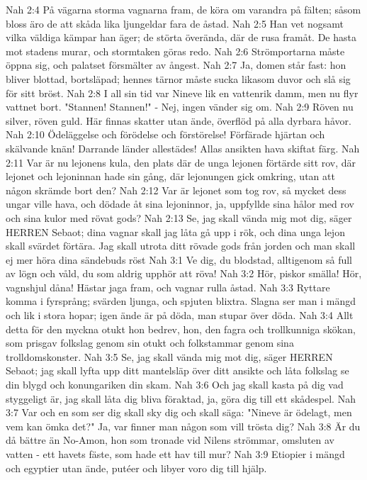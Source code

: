 Nah 2:4  På vägarna storma vagnarna fram, de köra om varandra på fälten; såsom bloss äro de att skåda lika ljungeldar fara de åstad.
Nah 2:5  Han vet nogsamt vilka väldiga kämpar han äger; de störta överända, där de rusa framåt. De hasta mot stadens murar, och stormtaken göras redo.
Nah 2:6  Strömportarna måste öppna sig, och palatset försmälter av ångest.
Nah 2:7  Ja, domen står fast: hon bliver blottad, bortsläpad; hennes tärnor måste sucka likasom duvor och slå sig för sitt bröst.
Nah 2:8  I all sin tid var Nineve lik en vattenrik damm, men nu flyr vattnet bort. "Stannen! Stannen!" - Nej, ingen vänder sig om.
Nah 2:9  Röven nu silver, röven guld. Här finnas skatter utan ände, överflöd på alla dyrbara håvor.
Nah 2:10  Ödeläggelse och förödelse och förstörelse! Förfärade hjärtan och skälvande knän! Darrande länder allestädes! Allas ansikten hava skiftat färg.
Nah 2:11  Var är nu lejonens kula, den plats där de unga lejonen förtärde sitt rov, där lejonet och lejoninnan hade sin gång, där lejonungen gick omkring, utan att någon skrämde bort den?
Nah 2:12  Var är lejonet som tog rov, så mycket dess ungar ville hava, och dödade åt sina lejoninnor, ja, uppfyllde sina hålor med rov och sina kulor med rövat gods?
Nah 2:13  Se, jag skall vända mig mot dig, säger HERREN Sebaot; dina vagnar skall jag låta gå upp i rök, och dina unga lejon skall svärdet förtära. Jag skall utrota ditt rövade gods från jorden och man skall ej mer höra dina sändebuds röst
Nah 3:1  Ve dig, du blodstad, alltigenom så full av lögn och våld, du som aldrig upphör att röva!
Nah 3:2  Hör, piskor smälla! Hör, vagnshjul dåna! Hästar jaga fram, och vagnar rulla åstad.
Nah 3:3  Ryttare komma i fyrsprång; svärden ljunga, och spjuten blixtra. Slagna ser man i mängd och lik i stora hopar; igen ände är på döda, man stupar över döda.
Nah 3:4  Allt detta för den myckna otukt hon bedrev, hon, den fagra och trollkunniga skökan, som prisgav folkslag genom sin otukt och folkstammar genom sina trolldomskonster.
Nah 3:5  Se, jag skall vända mig mot dig, säger HERREN Sebaot; jag skall lyfta upp ditt mantelsläp över ditt ansikte och låta folkslag se din blygd och konungariken din skam.
Nah 3:6  Och jag skall kasta på dig vad styggeligt är, jag skall låta dig bliva föraktad, ja, göra dig till ett skådespel.
Nah 3:7  Var och en som ser dig skall sky dig och skall säga: "Nineve är ödelagt, men vem kan ömka det?" Ja, var finner man någon som vill trösta dig?
Nah 3:8  Är du då bättre än No-Amon, hon som tronade vid Nilens strömmar, omsluten av vatten - ett havets fäste, som hade ett hav till mur?
Nah 3:9  Etiopier i mängd och egyptier utan ände, putéer och libyer voro dig till hjälp.
